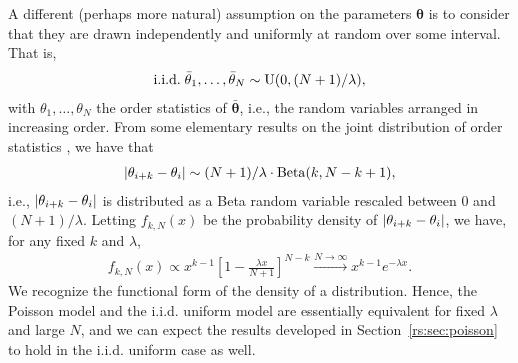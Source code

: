 A different (perhaps more natural) assumption on the parameters $\bm{\theta}$ is to consider that they are drawn independently and uniformly at random over some interval.
That is,
\begin{align*}
\text{i.i.d.}\; \bar{\theta}_1, \ldots, \bar{\theta}_N \sim \mathrm{U}( 0, (N+1) / \lambda ),
\end{align*}
with $\theta_1, \ldots, \theta_N$ the order statistics of $\bar{\bm{\theta}}$, i.e., the random variables arranged in increasing order.
From some elementary results on the joint distribution of order statistics \citep[see, e.g.,][]{arnold2008first}, we have that
\begin{align*}
\lvert\theta_{i+k} - \theta_{i}\rvert \sim (N+1) / \lambda \cdot \mathrm{Beta}( k, N - k + 1 ),
\end{align*}
i.e., $\lvert\theta_{i+k} - \theta_{i}\rvert$ is distributed as a Beta random variable rescaled between $0$ and $(N+1) / \lambda$.
Letting $f_{k,N}(x)$ be the probability density of $\lvert\theta_{i+k} - \theta_{i}\rvert$, we have, for any fixed $k$ and $\lambda$,
\begin{align*}
f_{k,N}(x) \propto x^{k-1} \left[ 1 - \frac{\lambda x}{N + 1} \right]^{N - k} \xrightarrow{N \to \infty} x^{k-1} e^{-\lambda x}.
\end{align*}
We recognize the functional form of the density of a  distribution.
Hence, the Poisson model and the i.i.d. uniform model are essentially equivalent for fixed $\lambda$ and large $N$, and we can expect the results developed in Section~\ref{rs:sec:poisson} to hold in the i.i.d. uniform case as well.
